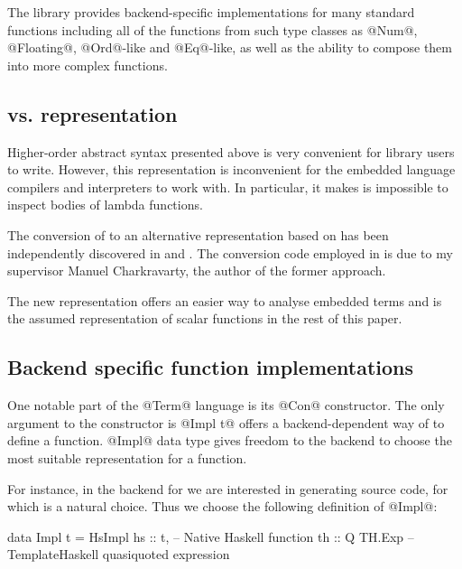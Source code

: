 \documentclass[preamble.tex]{subfiles}
\begin{document}
The library provides backend-specific implementations for many standard functions including all of the functions from such type classes as @Num@, @Floating@, @Ord@-like and @Eq@-like, as well as the ability to compose them into more complex functions.


\subsection{ vs.  representation}

Higher-order abstract syntax presented above is very convenient for library users to write. However, this representation is inconvenient for the embedded language compilers and interpreters to work with. In particular, it makes is impossible to inspect bodies of lambda functions.

The conversion of  to an alternative representation based on  has been independently discovered in \cite{HOAS2GADT} and \cite{Unembedding}. The conversion code employed in \LiveFusion is due to my supervisor Manuel Charkravarty, the author of the former approach.

The new representation offers an easier way to analyse embedded terms and is the assumed representation of scalar functions in the rest of this paper.



\subsection{Backend specific function implementations}

One notable part of the @Term@ language is its @Con@ constructor. The only argument to the constructor is @Impl t@ offers a backend-dependent way of to define a function. @Impl@ data type gives freedom to the backend to choose the most suitable representation for a function.

For instance, in the \Haskell backend for \LiveFusion we are interested in generating \Haskell source code, for which  \cite{TH} is a natural choice. Thus we choose the following definition of @Impl@:

\begin{hscode}
data Impl t = HsImpl {
                hs :: t,        -- Native Haskell function
                th :: Q TH.Exp  -- TemplateHaskell quasiquoted expression
              } 
\end{hscode}
\end{document}
